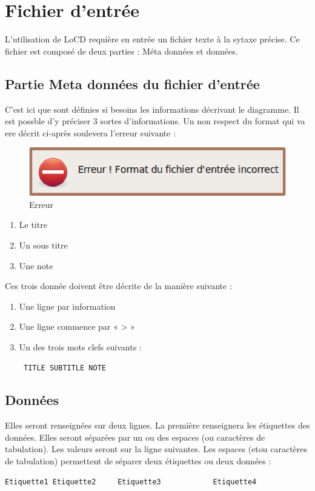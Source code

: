\chapter{Fichier d'entrée}
\label{chap:fichDonnees}
L'utilisation de LoCD requière en entrée un fichier texte à la sytaxe précise. Ce fichier est composé de deux parties : Méta données et données.%
\section{Partie Meta données du fichier d'entrée}
C'est ici que sont définies si besoins les informations décrivant le diagramme. Il est possble d'y préciser 3 sortes d'informations. Un non respect du format qui va ere décrit ci-après soulevera l'erreur suivante : 
\begin{figure}[htbp]
  \includegraphics[scale=0.40]{img/eformatfichier}
  \caption{Erreur}
  \label{fig:enbdonees}
\end{figure}


\begin{enumerate}
\item
Le titre 
\item
Un sous titre
\item
Une note
\end{enumerate}
Ces trois donnée doivent être décrite de la manière suivante : 
\begin{enumerate}
\item
Une ligne par information 
\item
Une ligne commence par  « > »
\item
Un des trois mots clefs suivants : \begin{verbatim} TITLE SUBTITLE NOTE \end{verbatim}

\end{enumerate}


\section{Données}
Elles seront renseignées sur deux lignes. La première renseignera les étiquettes des données. Elles seront séparées par un ou des espaces (ou caractères de tabulation). Les valeurs seront sur la ligne suivantes. Les espaces (et\/ou caractères de tabulation) permettent de séparer deux étiquettes ou deux données :
\begin{verbatim}
Etiquette1 Etiquette2     Etiquette3 			Etiquette4
 \end{verbatim} 
 



